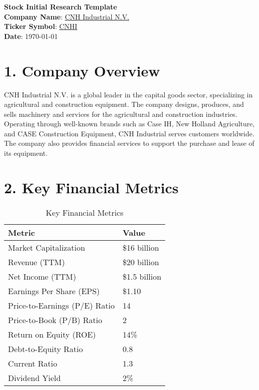 \documentclass[12pt]{article}
\begin{document}
\begin{center}
    {\Large \textbf{Stock Initial Research Template}}\\[1.5em]
    \textbf{Company Name}: \underline{CNH Industrial N.V.}\\[0.5em]
    \textbf{Ticker Symbol}: \underline{CNHI}\\[0.5em]
    \textbf{Date}: \today
\end{center}

\vspace{1em}

\section*{1. Company Overview}
CNH Industrial N.V. is a global leader in the capital goods sector, specializing in agricultural and construction equipment. The company designs, produces, and sells machinery and services for the agricultural and construction industries. Operating through well-known brands such as Case IH, New Holland Agriculture, and CASE Construction Equipment, CNH Industrial serves customers worldwide. The company also provides financial services to support the purchase and lease of its equipment.

\section*{2. Key Financial Metrics}
\begin{table}[H]
    \centering
    \begin{tabular}{@{}ll@{}}
        \toprule
        \textbf{Metric}                 & \textbf{Value}                    \\
        \midrule
        Market Capitalization           & \$16 billion                      \\
        Revenue (TTM)                   & \$20 billion                      \\
        Net Income (TTM)                & \$1.5 billion                     \\
        Earnings Per Share (EPS)        & \$1.10                            \\
        Price-to-Earnings (P/E) Ratio   & 14                                \\
        Price-to-Book (P/B) Ratio       & 2                                 \\
        Return on Equity (ROE)          & 14\%                              \\
        Debt-to-Equity Ratio            & 0.8                               \\
        Current Ratio                   & 1.3                               \\
        Dividend Yield                  & 2\%                               \\
        \bottomrule
    \end{tabular}
    \caption{Key Financial Metrics}
\end{table}
\end{document}
